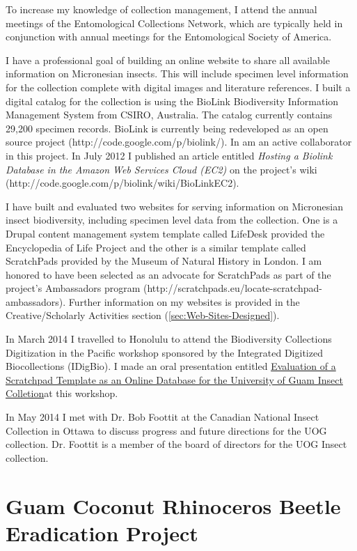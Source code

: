 \documentclass[12pt,oneside,english]{scrbook}
\begin{document}
To increase my knowledge of collection management, I attend the annual
meetings of the Entomological Collections Network, which are typically
held in conjunction with annual meetings for the Entomological Society
of America.

I have a professional goal of building an online website to share
all available information on Micronesian insects. This will include
specimen level information for the collection complete with digital
images and literature references. I built a digital catalog for the
collection is using the BioLink Biodiversity Information Management
System from CSIRO, Australia. The catalog currently contains 29,200
specimen records. BioLink is currently being redeveloped as an open
source project (http://code.google.com/p/biolink/). In am an active
collaborator in this project. In July 2012 I published an article
entitled \emph{Hosting a Biolink Database in the Amazon Web Services
Cloud (EC2)} on the project's wiki (http://code.google.com/p/biolink/wiki/BioLinkEC2).

I have built and evaluated two websites for serving information on
Micronesian insect biodiversity, including specimen level data from
the collection. One is a Drupal content management system template
called LifeDesk provided the Encyclopedia of Life Project and the
other is a similar template called ScratchPads provided by the Museum
of Natural History in London. I am honored to have been selected as
an advocate for ScratchPads as part of the project's Ambassadors program
(http://scratchpads.eu/locate-scratchpad-ambassadors). Further information
on my websites is provided in the Creative/Scholarly Activities section
(\ref{sec:Web-Sites-Designed}). 

In March 2014 I travelled to Honolulu to attend the Biodiversity Collections
Digitization in the Pacific workshop sponsored by the Integrated Digitized
Biocollections (IDigBio). I made an oral presentation entitled \href{Evaluation of a Scratchpad Template as an https://www.idigbio.org/wiki/images/a/aa/Scratchpads_iDigBio-part1.pdf}{Evaluation of a Scratchpad Template as an Online Database for the University of Guam Insect Colletion}at
this workshop. 

In May 2014 I met with Dr. Bob Foottit at the Canadian National Insect
Collection in Ottawa to discuss progress and future directions for
the UOG collection. Dr. Foottit is a member of the board of directors
for the UOG Insect collection. 

\section{Guam Coconut Rhinoceros Beetle Eradication Project}
\end{document}
